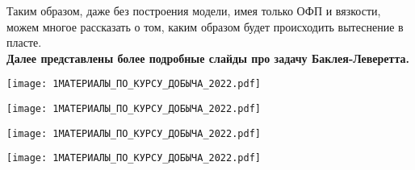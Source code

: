 Таким образом, даже без построения модели, имея только ОФП и вязкости, можем многое рассказать о том, каким образом будет происходить вытеснение в пласте.
\\

\textbf{Далее представлены более подробные слайды про задачу Баклея-Леверетта.}

\texttt{[image: 1МАТЕРИАЛЫ\_ПО\_КУРСУ\_ДОБЫЧА\_2022.pdf]}

\texttt{[image: 1МАТЕРИАЛЫ\_ПО\_КУРСУ\_ДОБЫЧА\_2022.pdf]}

\texttt{[image: 1МАТЕРИАЛЫ\_ПО\_КУРСУ\_ДОБЫЧА\_2022.pdf]}

\texttt{[image: 1МАТЕРИАЛЫ\_ПО\_КУРСУ\_ДОБЫЧА\_2022.pdf]}

